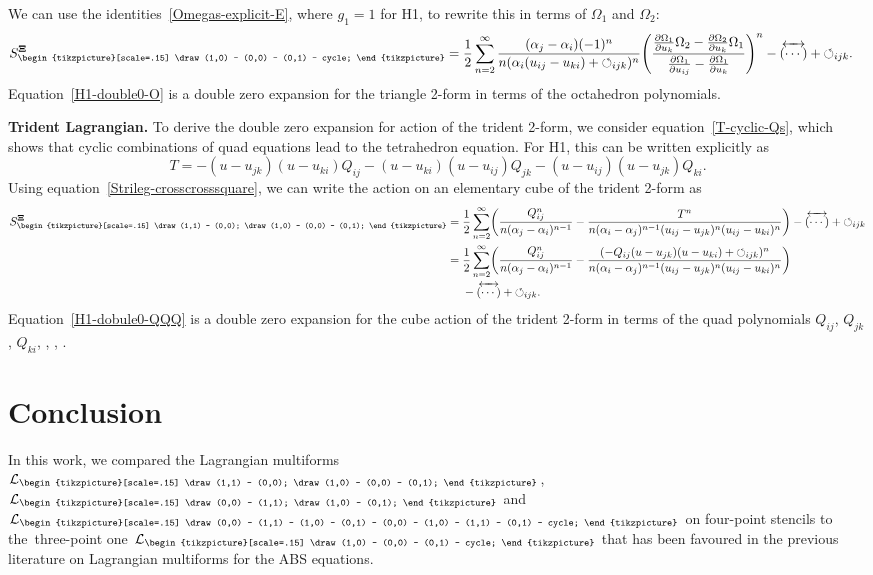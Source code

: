 \documentclass[pdftex]{sigma}
\newcommand{\inversion}[1]{\!\overleftrightarrow{\,#1\,}\!}
\newcommand{\reverse}{{\,\overleftrightarrow{\!(\cdots)\!}\,}}
\newcommand{\crosssquare}{{\begin{tikzpicture}[scale=.15]
			\draw (0,0) -- (1,1) -- (1,0) -- (0,1) -- (0,0) -- (1,0) -- (1,1) -- (0,1) -- cycle;
\end{tikzpicture}}}
\newcommand{\cross}{{\begin{tikzpicture}[scale=.15]
			\draw (0,0) -- (1,1);
			\draw (1,0) -- (0,1);
\end{tikzpicture}}}
\newcommand{\triang}{{\begin{tikzpicture}[scale=.15]
			\draw (1,0) -- (0,0) -- (0,1) -- cycle;
\end{tikzpicture}}}
\newcommand{\trileg}{{\begin{tikzpicture}[scale=.15]
			\draw (1,1) -- (0,0);
			\draw (1,0) -- (0,0) -- (0,1);
\end{tikzpicture}}}
\newcommand{\cyclic}{{\circlearrowleft}_{ijk}}
\newcommand{\pdv}[2]{\frac{\partial {#1}}{\partial {#2}}}
\newcommand{\cL}{\mathcal{L}}
\renewcommand{\vec}{\boldsymbol}
\numberwithin{equation}{section}
\begin{document}
We can use the identities~\eqref{Omegas-explicit-E}, where $g_1 = 1$ for H1, to rewrite this in terms of $\Omega_1$ and $\Omega_2$:
\begin{align}
 S_\triang^{\vec \Xi} & = \frac{1}{2}\sum_{n=2}^\infty \frac{(\alpha_j - \alpha_i)(-1)^n}{n (\alpha_i (u_{ij} - u_{ki}) + \cyclic)^n} \Biggl( \frac{\pdv{\Omega_1}{u_k} \Omega_2 - \pdv{\Omega_2}{u_k} \Omega_1}{\pdv{\Omega_1}{u_{ij}} - \pdv{\Omega_1}{u_k}} \Biggr)^n - \reverse + \cyclic .
 \label{H1-double0-O}
\end{align}
Equation~\eqref{H1-double0-O} is a double zero expansion for the triangle 2-form in terms of the octahedron polynomials.

{\bf Trident Lagrangian.}
To derive the double zero expansion for action of the trident 2-form, we consider equation~\eqref{T-cyclic-Qs}, which shows that cyclic combinations of quad equations lead to the tetrahedron equation. For H1, this can be written explicitly as
\begin{equation*}
T = - (u - u_{jk}) (u - u_{ki}) Q_{ij} - (u - u_{ki}) (u - u_{ij}) Q_{jk} - (u - u_{ij}) (u - u_{jk}) Q_{ki} .
\end{equation*}
Using equation~\eqref{Strileg-crosscrosssquare}, we can write the action on an elementary cube of the trident 2-form as
\begin{align}
S_\trileg^{\vec \Xi}
 ={}& \frac{1}{2}\sum_{n=2}^\infty \biggl(\frac{Q_{ij}^n}{n (\alpha_j - \alpha_i)^{n-1}} - \frac{T^n}{n (\alpha_i - \alpha_j)^{n-1} (u_{ij} - u_{jk})^n (u_{ij} - u_{ki})^n} \biggr) - \reverse + \cyclic \nonumber \notag\\
 ={}& \frac{1}{2}\sum_{n=2}^\infty \biggl(\frac{Q_{ij}^n}{n (\alpha_j - \alpha_i)^{n-1}} - \frac{(- Q_{ij} ( u - u_{jk} ) ( u - u_{ki} ) + \cyclic)^n}{n (\alpha_i - \alpha_j)^{n-1} (u_{ij} - u_{jk})^n (u_{ij} - u_{ki})^n} \biggr) \nonumber\\
 & - \reverse + \cyclic .\!
 \label{H1-dobule0-QQQ}
\end{align}
Equation~\eqref{H1-dobule0-QQQ} is a double zero expansion for the cube action of the trident 2-form in terms of the quad polynomials $Q_{ij}$, $Q_{jk}$, $Q_{ki}$, \smash{$\inversion Q_{ij}$}, \smash{$\inversion Q_{jk}$}, \smash{$\inversion Q_{ki}$}.

\section{Conclusion}

In this work, we compared the Lagrangian multiforms $\cL_\trileg$, $\cL_\cross$ and $\cL_\crosssquare$ on four-point stencils to the~three-point one $\cL_\triang$ that has been favoured in the previous literature on Lagrangian multiforms for the ABS equations.
\end{document}
